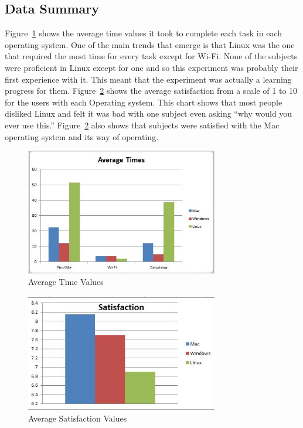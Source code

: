 \documentclass[11pt]{article}
\begin{document}
\subsection{Data Summary}
Figure~\ref{Average} shows the average time values it took to complete each task in each operating system. One of the main trends that emerge is that Linux was the one that required the most time for every task except for Wi-Fi. None of the subjects were proficient in Linux except for one and so this experiment was probably their first experience with it. This meant that the experiment was actually a learning progress for them. Figure~\ref{Satis} shows the average satisfaction from a scale of 1 to 10 for the users with each Operating system. This chart shows that most people disliked Linux and felt it was bad with one subject even asking ``why would you ever use this.'' Figure~\ref{Satis} also shows that subjects were satisfied with the Mac operating system and its way of operating.

\begin{figure}[h!]
  \centering
    \includegraphics[width=0.75\textwidth]{./Images/Average_Times}
  \caption{Average Time Values}
 \label{Average}
\end{figure}

\begin{figure}[h!]
  \centering
    \includegraphics[width=0.75\textwidth]{./Images/Satisfaction}
  \caption{Average Satisfaction Values}
 \label{Satis}
\end{figure}
\end{document}
